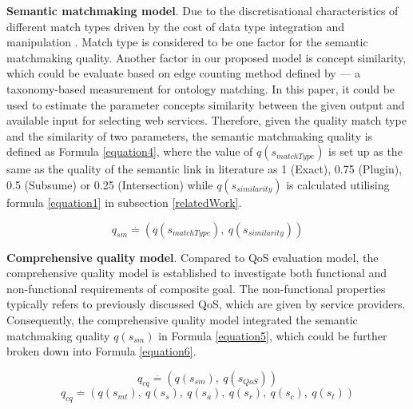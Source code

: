 \documentclass{llncs}
\begin{document}
\textbf{Semantic matchmaking model}. Due to the discretisational characteristics of different match types driven by the cost of  data type integration and manipulation \cite{lecue2009optimizing}. Match type is considered to be one factor for the semantic matchmaking quality. Another factor in our proposed model is concept similarity, which could be evaluate based on edge counting method defined by \cite{shet2012new} --- a taxonomy-based measurement for ontology matching. In this paper, it could be used to estimate the parameter concepts similarity between the given output and available input for selecting web services. Therefore, given the quality match type and the similarity of two parameters, the semantic matchmaking quality is defined as Formula \ref{equation4}, where the value of $q(s_ {matchType})$ is set up as the same as the quality of the semantic link in literature \cite{lecue2009optimizing} as 1 (Exact), 0.75 (Plugin), 0.5 (Subsume) or 0.25 (Intersection) while $q(s_ {similarity})$ is calculated utilising formula \ref{equation1} in subsection \ref{relatedWork}.

\begin{equation}
\label{equation4}
q_{sm} \stackrel{.}{=} (q(s_ {matchType}), \  q(s_ {similarity}))
\end{equation}

\textbf{Comprehensive quality model}. Compared to QoS evaluation model, the comprehensive quality model is established to investigate both functional and non-functional requirements of composite goal. The non-functional properties typically refers to previously discussed QoS, which are given by service providers. Consequently, the comprehensive quality model integrated the semantic matchmaking quality $q(s_{sm})$ in Formula \ref{equation5}, which could be further broken down into Formula \ref{equation6}.

\begin{equation}
\label{equation5}
q_{cq} \stackrel{.}{=} (q(s_ {sm}), \  q(s_ {QoS}))
\end{equation}
\begin{equation}
\label{equation6}
q_{cq} \stackrel{.}{=} (q(s_ {mt}), \  q(s_ {s}), \  q(s_{a}),\  q(s_{r}),\  q(s_{c}),\  q(s_{t}))
\end{equation}
\end{document}
